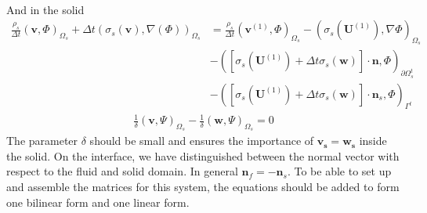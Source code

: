 \\
And in the solid
\begin{align}
\frac{\rho_s}{\Delta t}(\mathbf{v},\Phi)_{\Omega_s} + \Delta t (\sigma_s (\mathbf{v}), \nabla(\Phi))_{\Omega_s} & = \frac{\rho_s}{\Delta t}(\mathbf{v}^{(1)},\Phi)_{\Omega_s} - (\sigma_s(\mathbf{U}^{(1)}), \nabla \Phi)_{\Omega_s} \\
& - ([\sigma_s(\mathbf{U}^{(1)}) + \Delta t \sigma_s(\mathbf{w})]\cdot \mathbf{n}, \Phi)_{\partial \Omega_s^t} \\
& - ([\sigma_s(\mathbf{U}^{(1)}) + \Delta t \sigma_s(\mathbf{w})]\cdot \mathbf{n}_s, \Phi)_{\Gamma^t} \label{VarMom2}
\end{align}
\begin{align}
\frac{1}{\delta}(\mathbf{v},\Psi)_{\Omega_s} - \frac{1}{\delta}(\mathbf{w},\Psi)_{\Omega_s} = 0 \label{VarMesh2}
\end{align}
The parameter $\delta $ should be small and ensures the importance of $\mathbf{v_s} = \mathbf{w_s}$ inside the solid. On the interface, we have distinguished between the normal vector with respect to the fluid and solid domain. In general $\mathbf{n}_f = -\mathbf{n}_s$. To be able to set up and assemble the matrices for this system, the equations should be added to form one bilinear form and one linear form. 

